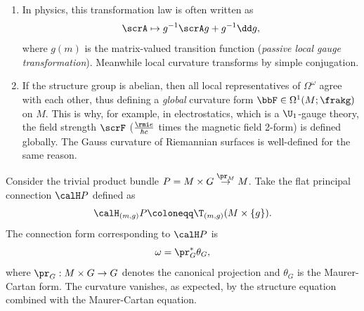 \begin{rem}
    \begin{enumerate}
        \item     In physics, this transformation law is often written as 
        \[\scrA\mapsto g^{-1}\scrA g+g^{-1}\dd g,\]
        where $g(m)$ is the matrix-valued transition function (\emph{passive local gauge transformation}). Meanwhile local curvature transforms by simple conjugation.     
        \item If the structure group is abelian, then all local representatives of $\Omega^\omega$ agree with each other, thus defining a \emph{global} curvature form $\bbF\in\Omega^1(M;\frakg)$ on $M$. This is why, for example, in electrostatics, which is a $\U_1$-gauge theory, the field strength $\scrF$ ($\frac{\rmi e}{\hbar c}$ times the magnetic field 2-form) is defined globally. The Gauss curvature of Riemannian surfaces is well-defined for the same reason.
    \end{enumerate}
\end{rem}
 



\begin{example}\label{ex 1.3.18 RS2}
    Consider the trivial product bundle $P=M\times G\overset{\pr_M}{\to}M$. Take the flat principal connection $\calH P$ defined as 
    \[\calH_{(m,g)}P\coloneqq \T_{(m,g)}(M\times \{g\}).\]
    The connection form corresponding to $\calH P$ is
    \[\omega=\pr_G^\ast \theta_G,\]
    where $\pr_G:M\times G\to G$ denotes the canonical projection and $\theta_G$ is the Maurer-Cartan form. The curvature vanishes, as expected, by the structure equation combined with the Maurer-Cartan equation.
\end{example}

